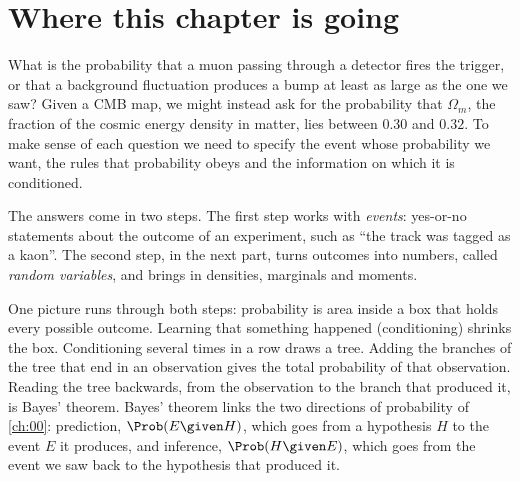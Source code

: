 \providecommand{\OneAMontyPostOne}{}\renewcommand{\OneAMontyPostOne}{0.3326}
\providecommand{\OneAMontyPostTwo}{}\renewcommand{\OneAMontyPostTwo}{0.6674}
\providecommand{\OneAMontyPostThree}{}\renewcommand{\OneAMontyPostThree}{0.0000}
\providecommand{\OneAMontyOpenThree}{}\renewcommand{\OneAMontyOpenThree}{0.5011}
\providecommand{\OneAMontySwitch}{}\renewcommand{\OneAMontySwitch}{0.6652}
\providecommand{\OneAMontyStay}{}\renewcommand{\OneAMontyStay}{0.3348}
\providecommand{\OneACardsNgreen}{}\renewcommand{\OneACardsNgreen}{150117}
\providecommand{\OneACardsHiddenGreen}{}\renewcommand{\OneACardsHiddenGreen}{0.6647}
 \providecommand{\oneaEx}[1]{\par\medskip\noindent\refstepcounter{wex}\textbf{Example~\thewex\ifx\relax#1\relax\else\ (#1)\fi.}\ }
\section*{Where this chapter is going}
\label{1a:sec:roadmap}

What is the probability that a muon passing through a detector fires the
trigger, or that a background fluctuation produces a bump at least as large
as the one we saw? Given a CMB map, we might instead ask for the probability
that $\Omega_m$, the fraction of the cosmic energy density in matter, lies
between $0.30$ and $0.32$. To make sense of each question we need to specify
the event whose probability we want, the rules that probability obeys and
the information on which it is conditioned.

The answers come in two steps. The first step works with \emph{events}: yes-or-no
statements about the outcome of an experiment, such as ``the track was tagged as
a kaon''. The second step, in the next part, turns outcomes into numbers, called
\emph{random variables}, and brings in densities, marginals and moments.

One picture runs through both steps: probability is area inside a box that holds
every possible outcome. Learning that something happened (conditioning) shrinks
the box. Conditioning several times in a row draws a tree. Adding the branches
of the tree that end in an observation gives the total probability of that
observation. Reading the tree backwards, from the observation to the branch that
produced it, is Bayes' theorem. Bayes' theorem links the two directions of
probability of \cref{ch:00}: prediction, $\Prob(E\given H)$, which goes from a
hypothesis $H$ to the event $E$ it produces, and inference, $\Prob(H\given E)$,
which goes from the event we saw back to the hypothesis that produced it.


